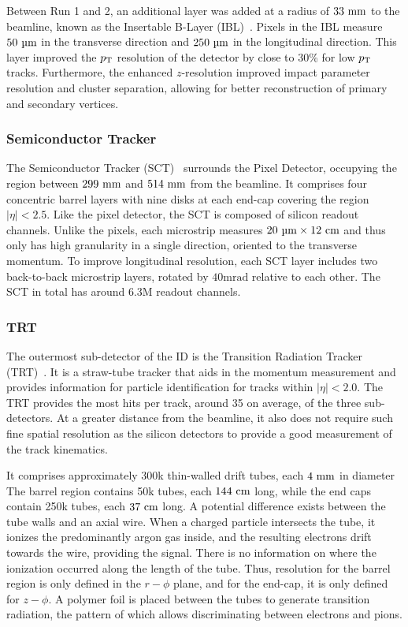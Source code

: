 Between Run 1 and 2, an additional layer was added at a radius of $33~\mm$ to the beamline, known as the Insertable B-Layer (IBL)~\cite{ATLASIBL}.
Pixels in the IBL measure $50~\um$ in the transverse direction and $250~\um$ in the longitudinal direction.
This layer improved the $p_\mathrm{T}$ resolution of the detector by close to 30\% for low $p_\mathrm{T}$ tracks.
Furthermore, the enhanced $z$-resolution improved impact parameter resolution and cluster separation, allowing for better reconstruction of primary and secondary vertices.

\subsubsection{Semiconductor Tracker}

The Semiconductor Tracker (SCT)~\cite{ATLASSCT} surrounds the Pixel Detector, occupying the region between $299~\mm$ and $514~\mm$ from the beamline.
It comprises four concentric barrel layers with nine disks at each end-cap covering the region $|\eta| < 2.5$.
Like the pixel detector, the SCT is composed of silicon readout channels. Unlike the pixels, each microstrip measures $20~\um \times 12~\cm$ and thus only has high granularity in a single direction, oriented to the transverse momentum.
To improve longitudinal resolution, each SCT layer includes two back-to-back microstrip layers, rotated by $40 \unit{\milli\radian}$ relative to each other.
The SCT in total has around 6.3M readout channels.

\subsubsection{TRT}

The outermost sub-detector of the ID is the Transition Radiation Tracker (TRT)~\cite{ATLASTRT}.
It is a straw-tube tracker that aids in the momentum measurement and provides information for particle identification for tracks within $|\eta| < 2.0$.
The TRT provides the most hits per track, around 35 on average, of the three sub-detectors.
At a greater distance from the beamline, it also does not require such fine spatial resolution as the silicon detectors to provide a good measurement of the track kinematics.

It comprises approximately 300k thin-walled drift tubes, each $4~\mm$ in diameter
The barrel region contains 50k tubes, each $144~\cm$ long, while the end caps contain 250k tubes, each $37~\cm$ long.
A potential difference exists between the tube walls and an axial wire.
When a charged particle intersects the tube, it ionizes the predominantly argon gas inside, and the resulting electrons drift towards the wire, providing the signal.
There is no information on where the ionization occurred along the length of the tube.
Thus, resolution for the barrel region is only defined in the $r-\phi$ plane, and for the end-cap, it is only defined for $z-\phi$.
A polymer foil is placed between the tubes to generate transition radiation, the pattern of which allows discriminating between electrons and pions.

